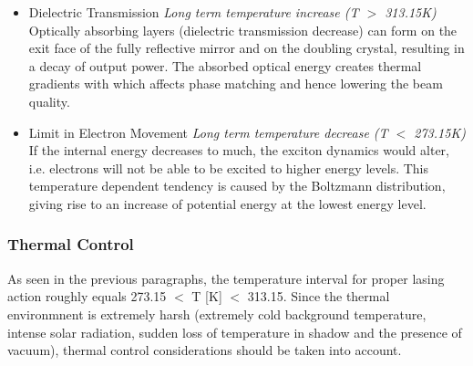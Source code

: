 \begin{itemize}
\item Dielectric Transmission
\textit{Long term temperature increase (T $>$ 313.15K)}
Optically absorbing layers (dielectric transmission decrease) can form on the exit face of the fully reflective mirror and on the doubling crystal, resulting in a decay of output power. The absorbed optical energy creates thermal gradients with which affects phase matching and hence lowering the beam quality. 

\item Limit in Electron Movement
\textit{Long term temperature decrease (T $<$ 273.15K)}
If the internal energy decreases to much, the exciton dynamics would alter, i.e. electrons will not be able to be excited to higher energy levels. This temperature dependent tendency is caused by the Boltzmann distribution, giving rise to an increase of potential energy at the lowest energy level. 
\end{itemize}	


\subsubsection{Thermal Control}
	\label{mtLSRthermalcontrol}
As seen in the previous paragraphs, the temperature interval for proper lasing action roughly equals 273.15 $<$ T [K] $<$ 313.15. Since the thermal environmnent is extremely harsh (extremely cold background temperature, intense solar radiation, sudden loss of temperature in shadow and the presence of vacuum), thermal control considerations should be taken into account. 

